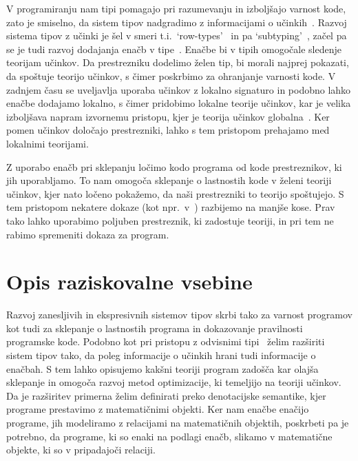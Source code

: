 \documentclass{article}
\begin{document}
V programiranju nam tipi pomagajo pri razumevanju in izboljšajo varnost kode, zato je smiselno, da sistem tipov nadgradimo z informacijami o učinkih~\cite{DBLP:conf/esop/PlotkinP09}. Razvoj sistema tipov z učinki je šel v smeri t.i.\ `row-types'~\cite{DBLP:conf/icfp/HillerstromL16} in pa `subtyping'~\cite{DBLP:conf/esop/SalehKPS18}, začel pa se je tudi razvoj dodajanja enačb v tipe~\cite{DBLP:journals/pacmpl/Ahman18}. Enačbe bi v tipih omogočale sledenje teorijam učinkov. Da prestrezniku dodelimo želen tip, bi morali najprej pokazati, da spoštuje teorijo učinkov, s čimer poskrbimo za ohranjanje varnosti kode. V zadnjem času se uveljavlja uporaba učinkov z lokalno signaturo in podobno lahko enačbe dodajamo lokalno, s čimer pridobimo lokalne teorije učinkov, kar je velika izboljšava napram izvornemu pristopu, kjer je teorija učinkov globalna~\cite{DBLP:conf/esop/PlotkinP09}. Ker pomen učinkov določajo prestrezniki, lahko s tem pristopom prehajamo med lokalnimi teorijami.

Z uporabo enačb pri sklepanju ločimo kodo programa od kode prestreznikov, ki jih uporabljamo. To nam omogoča sklepanje o lastnostih kode v želeni teoriji učinkov, kjer nato ločeno pokažemo, da naši prestrezniki to teorijo spoštujejo. S tem pristopom nekatere dokaze (kot npr.\ v~\cite{DBLP:journals/jlp/BauerP15}) razbijemo na manjše kose. Prav tako lahko uporabimo poljuben prestreznik, ki zadostuje teoriji, in pri tem ne rabimo spremeniti dokaza za program.

\section*{Opis raziskovalne vsebine}

Razvoj zanesljivih in ekspresivnih sistemov tipov skrbi tako za varnost programov kot tudi za sklepanje o lastnostih programa in dokazovanje pravilnosti programske kode. Podobno kot pri pristopu z odvisnimi tipi~\cite{DBLP:journals/pacmpl/Ahman18} želim razširiti sistem tipov tako, da poleg informacije o učinkih hrani tudi informacije o enačbah. S tem lahko opisujemo kakšni teoriji program zadošča kar olajša sklepanje in omogoča razvoj metod optimizacije, ki temeljijo na teoriji učinkov. Da je razširitev primerna želim definirati preko denotacijske semantike, kjer programe prestavimo z matematičnimi objekti. Ker nam enačbe enačijo programe, jih modeliramo z relacijami na matematičnih objektih, poskrbeti pa je potrebno, da programe, ki so enaki na podlagi enačb, slikamo v matematične objekte, ki so v pripadajoči relaciji. 
\end{document}
